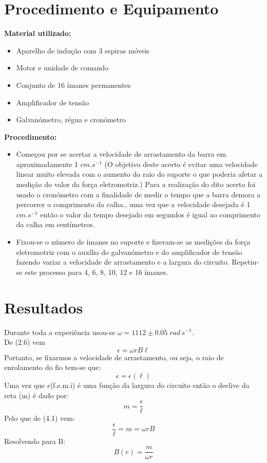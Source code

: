 \documentclass[11pt]{report}
\begin{document}
\chapter{Procedimento e Equipamento}
\textbf{Material utilizado:}
\begin{itemize}
\item Aparelho de indução com 3 espiras móveis
\item Motor e unidade de comando
\item Conjunto de 16 ímanes permanentes
\item Amplificador de tensão
\item Galvanómetro, régua e cronómetro
\end{itemize}
\textbf{Procedimento:}
\begin{itemize}
\item Começou por se acertar a velocidade de arrastamento da barra em aproximadamente 1 $cm.s^{-1}$ (O objetivo deste acerto é evitar uma velocidade linear muito elevada com o aumento do raio do suporte o que poderia afetar a medição do valor da força eletromotriz.) Para a realização do dito acerto foi usado o cronómetro com a finalidade de medir o tempo que a barra demora a percorrer o comprimento da calha., uma vez que a velocidade desejada é 1 $cm.s^{-1}$ então o valor do tempo desejado em segundos é igual ao comprimento da calha em centímetros.
\item Fixou-se o número de ímanes no suporte e fizeram-se as medições da força eletromotriz com o auxílio do galvanómetro e do amplificador de tensão fazendo variar a velocidade de arrastamento e a largura do circuito. Repetiu-se este processo para 4, 6, 8, 10, 12 e 16 ímanes.


\end{itemize}
\chapter{Resultados}
Durante toda a experiência usou-se $\omega=1112\pm0.05\;rad\,s^{-1}.$\\
De (2.6) vem
\begin{equation}
	\epsilon = \omega rB\ell
\end{equation}
Portanto, se fixarmos a velocidade de arrastamento, ou seja, o raio de enrolamento do fio tem-se que:
\begin{equation}
	\epsilon = \epsilon(\ell)
\end{equation}
Uma vez que $\epsilon$(f.e.m.i) é uma função da largura do circuito então o declive da reta (m) é dado por:
\begin{equation}
	m = \frac{\epsilon}{\ell}
\end{equation}
Pelo que de (4.1) vem:
\begin{equation}
	\frac{\epsilon}{\ell} = m = \omega rB
\end{equation}
Resolvendo para B:
\begin{equation}
	B(r) = \frac{m}{\omega r}
\end{equation}
\end{document}
